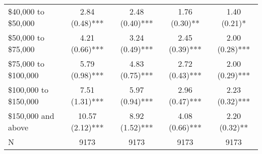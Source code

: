 \documentclass[11pt]{article}
\begin{document}
\begin{landscape}
\begin{table}
\begin{tabular}{l|c|c|c|c}
      \enspace \$40,000 to \$50,000  & 2.84 (0.48)***     & 2.48 (0.40)***     &  1.76 (0.30)**    & 1.40 (0.21)*            \\
      \enspace \$50,000 to \$75,000  & 4.21 (0.66)***     & 3.24 (0.49)***     &  2.45 (0.39)***   & 2.00 (0.28)***            \\
      \enspace \$75,000 to \$100,000 & 5.79 (0.98)***     & 4.83 (0.75)***     &  2.72 (0.43)***   & 2.00 (0.29)***            \\
      \enspace \$100,000 to \$150,000 & 7.51 (1.31)***    & 5.97 (0.94)***     &  2.96 (0.47)***   & 2.23 (0.32)***    \\
      \enspace \$150,000 and above  & 10.57 (2.12)***     & 8.92 (1.52)***     &  4.08 (0.66)***   & 2.20 (0.32)**            \\
    \hline  %
    N                     & 9173                     &  9173                   &   9173            &  9173 \\
    \hline
  \end{tabular}
\end{table}

\end{landscape}
\restoregeometry
\newpage


\newpage
\hypertarget{references}{%
\label{references}}
\renewcommand{\bibname}{References}



\end{document}
